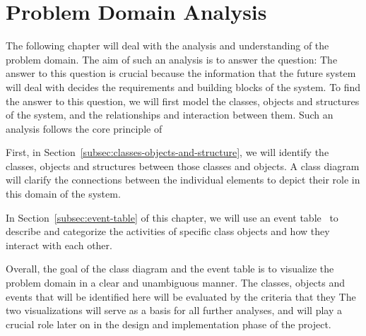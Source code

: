 \section{Problem Domain Analysis}\label{sec:problem-domain-analysis}

The following chapter will deal with the analysis and understanding of the problem domain.
The aim of such an analysis is to answer the question:
The answer to this question is crucial because the information that the future system will deal with decides the
requirements and building blocks of the system.
To find the answer to this question, we will first model the classes, objects and structures of the system, and the
relationships and interaction between them.
Such an analysis follows the core principle of

First, in Section~\ref{subsec:classes-objects-and-structure}, we will identify the classes, objects and structures
between those classes and objects.
A class diagram will clarify the connections between the individual elements to depict their role in this domain of the
system.

In Section~\ref{subsec:event-table} of this chapter, we will use an event table~\cite[52]{mathiassen2018} to describe
and categorize the activities of specific class objects and how they interact with each other.

Overall, the goal of the class diagram and the event table is to visualize the problem domain in a clear and unambiguous
manner.
The classes, objects and events that will be identified here will be evaluated by the criteria that they
The two visualizations will serve as a basis for all further analyses, and will play a crucial role later on in the
design and implementation phase of the project.



